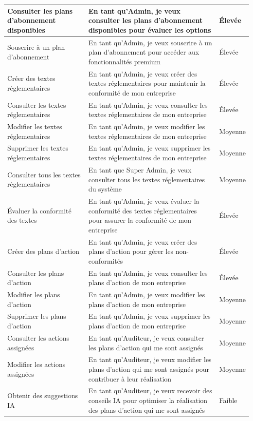 \begin{longtable}{|>{\raggedright\arraybackslash}p{4cm}|>{\raggedright\arraybackslash}p{7cm}|>{\raggedright\arraybackslash}p{2cm}|}
Consulter les plans d'abonnement disponibles & En tant qu'Admin, je veux consulter les plans d'abonnement disponibles pour évaluer les options & Élevée \\
\hline
Souscrire à un plan d'abonnement & En tant qu'Admin, je veux souscrire à un plan d'abonnement pour accéder aux fonctionnalités premium & Élevée \\
\hline
Créer des textes réglementaires & En tant qu'Admin, je veux créer des textes réglementaires pour maintenir la conformité de mon entreprise & Élevée \\
\hline
Consulter les textes réglementaires & En tant qu'Admin, je veux consulter les textes réglementaires de mon entreprise & Élevée \\
\hline
Modifier les textes réglementaires & En tant qu'Admin, je veux modifier les textes réglementaires de mon entreprise & Moyenne \\
\hline
Supprimer les textes réglementaires & En tant qu'Admin, je veux supprimer les textes réglementaires de mon entreprise & Moyenne \\
\hline
Consulter tous les textes réglementaires & En tant que Super Admin, je veux consulter tous les textes réglementaires du système & Moyenne \\
\hline
Évaluer la conformité des textes & En tant qu'Admin, je veux évaluer la conformité des textes réglementaires pour assurer la conformité de mon entreprise & Élevée \\
\hline
Créer des plans d'action & En tant qu'Admin, je veux créer des plans d'action pour gérer les non-conformités & Élevée \\
\hline
Consulter les plans d'action & En tant qu'Admin, je veux consulter les plans d'action de mon entreprise & Élevée \\
\hline
Modifier les plans d'action & En tant qu'Admin, je veux modifier les plans d'action de mon entreprise & Moyenne \\
\hline
Supprimer les plans d'action & En tant qu'Admin, je veux supprimer les plans d'action de mon entreprise & Moyenne \\
\hline
Consulter les actions assignées & En tant qu'Auditeur, je veux consulter les plans d'action qui me sont assignés & Moyenne \\
\hline
Modifier les actions assignées & En tant qu'Auditeur, je veux modifier les plans d'action qui me sont assignés pour contribuer à leur réalisation & Moyenne \\
\hline
Obtenir des suggestions IA & En tant qu'Auditeur, je veux recevoir des conseils IA pour optimiser la réalisation des plans d'action qui me sont assignés & Faible \\
\hline
\end{longtable}


